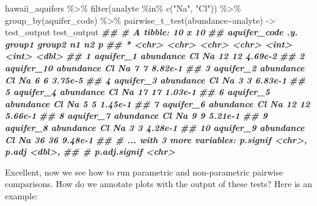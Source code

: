 \documentclass[
]{krantz}
\newenvironment{Shaded}{\begin{snugshade}}{\end{snugshade}}
\newcommand{\DocumentationTok}[1]{\textcolor[rgb]{0.56,0.35,0.01}{\textbf{\textit{#1}}}}
\newcommand{\FunctionTok}[1]{\textcolor[rgb]{0.00,0.00,0.00}{#1}}
\newcommand{\NormalTok}[1]{#1}
\newcommand{\OtherTok}[1]{\textcolor[rgb]{0.56,0.35,0.01}{#1}}
\newcommand{\SpecialCharTok}[1]{\textcolor[rgb]{0.00,0.00,0.00}{#1}}
\newcommand{\StringTok}[1]{\textcolor[rgb]{0.31,0.60,0.02}{#1}}
\begin{document}
\begin{Shaded}
\begin{Highlighting}[]
\NormalTok{hawaii\_aquifers }\SpecialCharTok{\%\textgreater{}\%}
  \FunctionTok{filter}\NormalTok{(analyte }\SpecialCharTok{\%in\%} \FunctionTok{c}\NormalTok{(}\StringTok{"Na"}\NormalTok{, }\StringTok{"Cl"}\NormalTok{)) }\SpecialCharTok{\%\textgreater{}\%}
  \FunctionTok{group\_by}\NormalTok{(aquifer\_code) }\SpecialCharTok{\%\textgreater{}\%}
  \FunctionTok{pairwise\_t\_test}\NormalTok{(abundance}\SpecialCharTok{\textasciitilde{}}\NormalTok{analyte) }\OtherTok{{-}\textgreater{}}\NormalTok{ test\_output}
\NormalTok{  test\_output}
\DocumentationTok{\#\# \# A tibble: 10 x 10}
\DocumentationTok{\#\#    aquifer\_code .y.       group1 group2    n1    n2        p}
\DocumentationTok{\#\#  * \textless{}chr\textgreater{}        \textless{}chr\textgreater{}     \textless{}chr\textgreater{}  \textless{}chr\textgreater{}  \textless{}int\textgreater{} \textless{}int\textgreater{}    \textless{}dbl\textgreater{}}
\DocumentationTok{\#\#  1 aquifer\_1    abundance Cl     Na        12    12  4.69e{-}2}
\DocumentationTok{\#\#  2 aquifer\_10   abundance Cl     Na         7     7  8.82e{-}1}
\DocumentationTok{\#\#  3 aquifer\_2    abundance Cl     Na         6     6  3.75e{-}5}
\DocumentationTok{\#\#  4 aquifer\_3    abundance Cl     Na         3     3  6.83e{-}1}
\DocumentationTok{\#\#  5 aquifer\_4    abundance Cl     Na        17    17  1.03e{-}1}
\DocumentationTok{\#\#  6 aquifer\_5    abundance Cl     Na         5     5  1.45e{-}1}
\DocumentationTok{\#\#  7 aquifer\_6    abundance Cl     Na        12    12  5.66e{-}1}
\DocumentationTok{\#\#  8 aquifer\_7    abundance Cl     Na         9     9  5.21e{-}1}
\DocumentationTok{\#\#  9 aquifer\_8    abundance Cl     Na         3     3  4.28e{-}1}
\DocumentationTok{\#\# 10 aquifer\_9    abundance Cl     Na        36    36  9.48e{-}1}
\DocumentationTok{\#\# \# ... with 3 more variables: p.signif \textless{}chr\textgreater{}, p.adj \textless{}dbl\textgreater{},}
\DocumentationTok{\#\# \#   p.adj.signif \textless{}chr\textgreater{}}
\end{Highlighting}
\end{Shaded}

Excellent, now we see how to run parametric and non-parametric pairwise comparisons. How do we annotate plots with the output of these tests? Here is an example:
\end{document}
